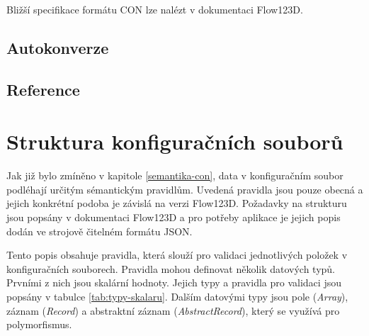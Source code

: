\documentclass[FM,MP]{tulthesis}
\begin{document}
	Bližší specifikace formátu CON lze nalézt v dokumentaci Flow123D. %

	\section{Autokonverze}

	\section{Reference}

\chapter{Struktura konfiguračních souborů}
	Jak již bylo zmíněno v kapitole \ref{semantika-con}, data v konfiguračním soubor podléhají určitým sémantickým pravidlům. Uvedená pravidla jsou pouze obecná a jejich konkrétní podoba je závislá na verzi Flow123D. Požadavky na strukturu jsou popsány v dokumentaci Flow123D a pro potřeby aplikace je jejich popis dodán ve strojově čitelném formátu JSON.

	Tento popis obsahuje pravidla, která slouží pro validaci jednotlivých položek v konfiguračních souborech. Pravidla mohou definovat několik datových typů. Prvními z nich jsou skalární hodnoty. Jejich typy a pravidla pro validaci jsou popsány v tabulce \ref{tab:typy-skalaru}. Dalším datovými typy jsou pole (\textit{Array}), záznam (\textit{Record}) a abstraktní záznam (\textit{AbstractRecord}), který se využívá pro polymorfismus.

\end{document}
